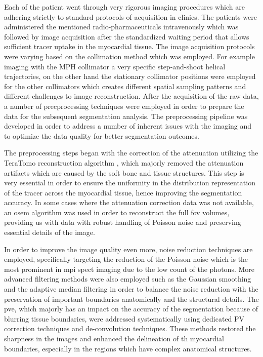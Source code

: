 Each of the patient went through very rigorous imaging procedures which are adhering strictly to standard protocols of acquisition in clinics. The patients were administered the mentioned radio-pharmaceuticals intravenously which was followed by image acquisition after the standardized waiting period that allows sufficient tracer uptake in the myocardial tissue. The image acquisition protocols were varying based on the collimation method which was employed. For example imaging with the MPH collimator a very specific step-and-shoot helical trajectories, on the other hand the stationary collimator positions were employed for the other collimators which creates different spatial sampling patterns and different challenges to image reconstruction. After the acquisition of the raw data, a number of precprocessing techniques were employed in order to prepare the data for the subsequent segmentation analysis. The preprocessing pipeline was developed in order to address a number of inherent issues with the imaging and to optimize the data quality for better segmentation outcomes.

The preprocessing steps began with the correction of the attenuation utilizing the TeraTomo reconstruction algorithm \cite{Nagy2013}, which majorly removed the attenuation artifacts which are caused by the soft bone and tissue structures. This step is very essential in order to ensure the uniformity in the distribution representation of the tracer across the myocardial tissue, hence improving the segmentation accuracy. In some cases where the attenuation correction data was not available, an \gls{osem} algorithm \cite{Hudson1994} was used in order to reconstruct the full \gls{fov} volumes, providing us with data with robust handling of Poisson noise and preserving essential details of the image. 

In order to improve the image quality even more, noise reduction techniques are employed, specifically targeting the reduction of the Poisson noise which is the most prominent in \gls{mpi} \gls{spect} imaging due to the low count of the photons. More advanced filtering methods were also employed such as the Gaussian smoothing and the adaptive median filtering in order to balance the noise reduction with the preservation of important boundaries anatomically and the structural details. The \gls{pve}, which majorly has an impact on the accuracy of the segmentation because of blurring tissue boundaries, were addressed systematically using dedicated PV correction techniques and de-convolution techniques. These methods restored the sharpness in the images and enhanced the delineation of th myocardial boundaries, especially in the regions which have complex anatomical structures.

